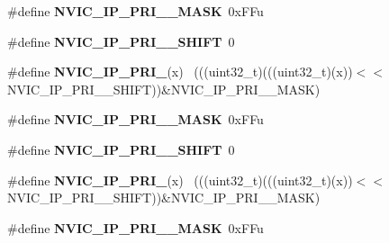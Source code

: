 \begin{DoxyCompactItemize}
\item 
\hypertarget{group___n_v_i_c___register___masks_gab2866da6e20a3704e6a7bf5c044414db}{}\#define {\bfseries N\+V\+I\+C\+\_\+\+I\+P\+\_\+\+P\+R\+I\+\_\+\_\+\+M\+A\+S\+K}~0x\+F\+Fu\label{group___n_v_i_c___register___masks_gab2866da6e20a3704e6a7bf5c044414db}

\item 
\hypertarget{group___n_v_i_c___register___masks_ga8c12a02af6fcba3c5a923613aaf0cac9}{}\#define {\bfseries N\+V\+I\+C\+\_\+\+I\+P\+\_\+\+P\+R\+I\+\_\+\_\+\+S\+H\+I\+F\+T}~0\label{group___n_v_i_c___register___masks_ga8c12a02af6fcba3c5a923613aaf0cac9}

\item 
\hypertarget{group___n_v_i_c___register___masks_ga4d17554d3610422f9bd6a5a56d1a9bf4}{}\#define {\bfseries N\+V\+I\+C\+\_\+\+I\+P\+\_\+\+P\+R\+I\+\_}(x)                                            ~(((uint32\+\_\+t)(((uint32\+\_\+t)(x))$<$$<$N\+V\+I\+C\+\_\+\+I\+P\+\_\+\+P\+R\+I\+\_\+\_\+\+S\+H\+I\+F\+T))\&N\+V\+I\+C\+\_\+\+I\+P\+\_\+\+P\+R\+I\+\_\+\_\+\+M\+A\+S\+K)\label{group___n_v_i_c___register___masks_ga4d17554d3610422f9bd6a5a56d1a9bf4}

\item 
\hypertarget{group___n_v_i_c___register___masks_ga51ce88956f81659d9a1adb5bc13f2775}{}\#define {\bfseries N\+V\+I\+C\+\_\+\+I\+P\+\_\+\+P\+R\+I\+\_\+\_\+\+M\+A\+S\+K}~0x\+F\+Fu\label{group___n_v_i_c___register___masks_ga51ce88956f81659d9a1adb5bc13f2775}

\item 
\hypertarget{group___n_v_i_c___register___masks_gac11a0fc7986b861dd44c4d4d3cdc2b50}{}\#define {\bfseries N\+V\+I\+C\+\_\+\+I\+P\+\_\+\+P\+R\+I\+\_\+\_\+\+S\+H\+I\+F\+T}~0\label{group___n_v_i_c___register___masks_gac11a0fc7986b861dd44c4d4d3cdc2b50}

\item 
\hypertarget{group___n_v_i_c___register___masks_ga6d770200ee4df3e0605fa7036cc4b424}{}\#define {\bfseries N\+V\+I\+C\+\_\+\+I\+P\+\_\+\+P\+R\+I\+\_}(x)                                            ~(((uint32\+\_\+t)(((uint32\+\_\+t)(x))$<$$<$N\+V\+I\+C\+\_\+\+I\+P\+\_\+\+P\+R\+I\+\_\+\_\+\+S\+H\+I\+F\+T))\&N\+V\+I\+C\+\_\+\+I\+P\+\_\+\+P\+R\+I\+\_\+\_\+\+M\+A\+S\+K)\label{group___n_v_i_c___register___masks_ga6d770200ee4df3e0605fa7036cc4b424}

\item 
\hypertarget{group___n_v_i_c___register___masks_ga909049e7c2fb5096158e358b6705c626}{}\#define {\bfseries N\+V\+I\+C\+\_\+\+I\+P\+\_\+\+P\+R\+I\+\_\+\_\+\+M\+A\+S\+K}~0x\+F\+Fu\label{group___n_v_i_c___register___masks_ga909049e7c2fb5096158e358b6705c626}


\end{DoxyCompactItemize}
